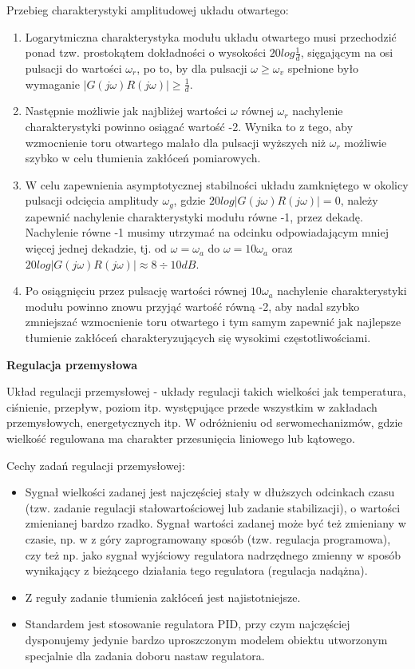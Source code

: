 Przebieg charakterystyki amplitudowej układu otwartego:
\begin{enumerate}
    \item Logarytmiczna charakterystyka modułu układu otwartego musi przechodzić ponad tzw. prostokątem dokładności o wysokości $20log\frac{1}{d}$, sięgającym na osi pulsacji do wartości $\omega_r$, po to, by dla pulsacji $\omega \geq \omega_v$ spełnione było wymaganie $|G(j\omega)R(j\omega)|\geq \frac{1}{d}$.
    \item Następnie możliwie jak najbliżej wartości $\omega$ równej $\omega_r$ nachylenie charakterystyki powinno osiągać wartość -2. Wynika to z tego, aby wzmocnienie toru otwartego malało dla pulsacji wyższych niż $\omega_r$ możliwie szybko w celu tłumienia zakłóceń pomiarowych.
    \item W celu zapewnienia asymptotycznej stabilności układu zamkniętego w okolicy pulsacji odcięcia amplitudy $\omega_g$, gdzie $20log|G(j\omega)R(j\omega)| = 0$, należy zapewnić nachylenie charakterystyki modułu równe -1, przez dekadę. Nachylenie równe -1 musimy utrzymać na odcinku odpowiadającym mniej więcej jednej dekadzie, tj. od $\omega = \omega_a$ do $\omega=10\omega_a$ oraz $20log|G(j\omega)R(j\omega)| \approx 8 \div 10dB$.
    \item Po osiągnięciu przez pulsację wartości równej $10\omega_a$ nachylenie charakterystyki modułu powinno znowu przyjąć wartość równą -2, aby nadal szybko zmniejszać wzmocnienie toru otwartego i tym samym zapewnić jak najlepsze tłumienie zakłóceń charakteryzujących się wysokimi częstotliwościami.
\end{enumerate}

\textbf{Regulacja przemysłowa}

Układ regulacji przemysłowej - układy regulacji takich wielkości jak temperatura, ciśnienie, przepływ, poziom itp. występujące przede wszystkim w zakładach przemysłowych, energetycznych itp. W odróżnieniu od serwomechanizmów, gdzie wielkość regulowana ma charakter przesunięcia liniowego lub kątowego.

Cechy zadań regulacji przemysłowej:
\begin{itemize}
    \item Sygnał wielkości zadanej jest najczęściej stały w dłuższych odcinkach czasu (tzw. zadanie regulacji stałowartościowej lub zadanie stabilizacji), o wartości zmienianej bardzo rzadko. Sygnał wartości zadanej może być też zmieniany w czasie, np. w z góry zaprogramowany sposób (tzw. regulacja programowa), czy też np. jako sygnał wyjściowy regulatora nadrzędnego zmienny w sposób wynikający z bieżącego działania tego regulatora (regulacja nadążna).
    \item Z reguły zadanie tłumienia zakłóceń jest najistotniejsze.
    \item Standardem jest stosowanie regulatora PID, przy czym najczęściej dysponujemy jedynie bardzo uproszczonym modelem obiektu utworzonym specjalnie dla zadania doboru nastaw regulatora.
\end{itemize}

